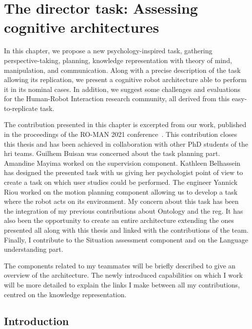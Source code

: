 \ifdefined{}
\else
\setcounter{chapter}{9} %
\dominitoc
\faketableofcontents
\fi

\chapter{The director task: Assessing cognitive architectures}
\minitoc
\label{chap:9}

In this chapter, we propose a new psychology-inspired task, gathering perspective-taking, planning, knowledge representation with theory of mind, manipulation, and communication. Along with a precise description of the task allowing its replication, we present a cognitive robot architecture able to perform it in its nominal cases. In addition, we suggest some challenges and evaluations for the Human-Robot Interaction research community, all derived from this easy-to-replicate task.

The contribution presented in this chapter is excerpted from our work, published in the proceedings of the RO-MAN 2021 conference~\cite{sarthou_2021_director}. This contribution closes this thesis and has been achieved in collaboration with other PhD students of the \acrshort{hri} teams. Guilhem Buisan was concerned about the task planning part. Amandine Mayima worked on the supervision component. Kathleen Belhassein has designed the presented task with us giving her psychologist point of view to create a task on which user studies could be performed. The engineer Yannick Riou worked on the motion planning component allowing us to develop a task where the robot acts on its environment. My concern about this task has been the integration of my previous contributions about Ontology and the \acrshort{reg}. It has also been the opportunity to create an entire architecture extending the ones presented all along with this thesis and linked with the contributions of the team. Finally, I contribute to the Situation assessment component and on the Language understanding part.

The components related to my teammates will be briefly described to give an overview of the architecture. The newly introduced capabilities on which I work will be more detailed to explain the links I make between all my contributions, centred on the knowledge representation.

\section{Introduction}

